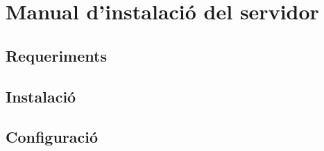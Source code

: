 \chapter{Manual d'instalació del servidor}

\section{Requeriments}

\section{Instalació}

\section{Configuració}
